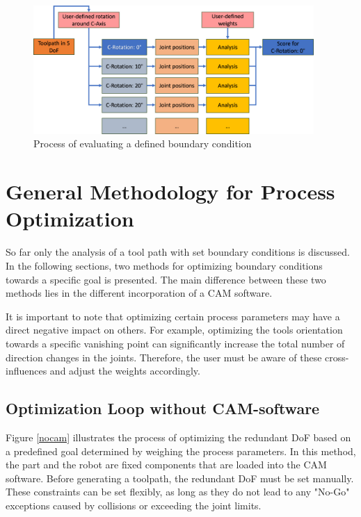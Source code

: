 \begin{figure}[H]
	\centerline{\includegraphics[width=0.95\textwidth]{figures/grob.png}}
	\caption{Process of evaluating a defined boundary condition}
	\label{grob}
\end{figure}
















\newpage
\section{General Methodology for Process Optimization}
So far only the analysis of a tool path with set boundary conditions is discussed. In the following sections, two methods for optimizing boundary conditions towards a specific goal is presented. The main difference between these two methods lies in the different incorporation of a CAM software.

It is important to note that optimizing certain process parameters may have a direct negative impact on others. For example, optimizing the tools orientation towards a specific vanishing point can significantly increase the total number of direction changes in the joints. Therefore, the user must be aware of these cross-influences and adjust the weights accordingly.

\subsection{Optimization Loop without CAM-software}\label{nocamchap}

Figure \ref{nocam} illustrates the process of optimizing the redundant DoF based on a predefined goal determined by weighing the process parameters. In this method, the part and the robot are fixed components that are loaded into the CAM software. Before generating a toolpath, the redundant DoF must be set manually. These constraints can be set flexibly, as long as they do not lead to any "No-Go" exceptions caused by collisions or exceeding the joint limits.

